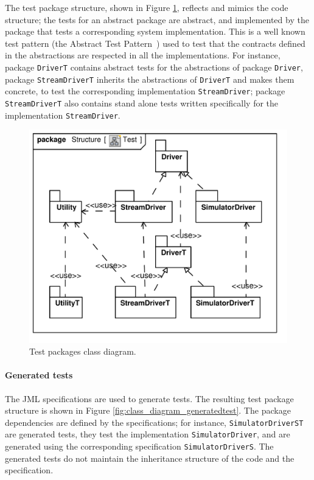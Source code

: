 \documentclass[english]{lni}
\newcommand{\lil}[1]{\texttt{\lstinline|#1|}}
\begin{document}
The test package structure, shown in Figure \ref{fig:class_diagram_test}, reflects and mimics the code structure; the tests for an abstract package are abstract, and implemented by the package that tests a corresponding system implementation. 
This is a well known test pattern (the Abstract Test Pattern~\cite{Thomas2004}) used to test that the contracts defined in the abstractions are respected in all the implementations.  
For instance, package \lil{DriverT} contains abstract tests for the abstractions of package \lil{Driver}, package \lil{StreamDriverT} inherits the abstractions of \lil{DriverT} and makes them concrete, to test the corresponding implementation \lil{StreamDriver}; package \lil{StreamDriverT} also contains stand alone tests written specifically for the implementation \lil{StreamDriver}.

\begin{figure}[htb!]
  \centering
  \includegraphics[scale=0.4]{UML_model/Class_Diagram__Structure__Test}
  \caption{Test packages class diagram.}
  \label{fig:class_diagram_test}
\end{figure}

\paragraph*{Generated tests}

The JML specifications are used to generate tests.
The resulting test package structure is shown in Figure \ref{fig:class_diagram_generatedtest}.  
The package dependencies are defined by the specifications; for instance, \lil{SimulatorDriverST} are generated tests, they test the implementation \lil{SimulatorDriver}, and are generated using the corresponding specification \lil{SimulatorDriverS}.  
The generated tests do not maintain the inheritance structure of the code and the specification.
\end{document}
